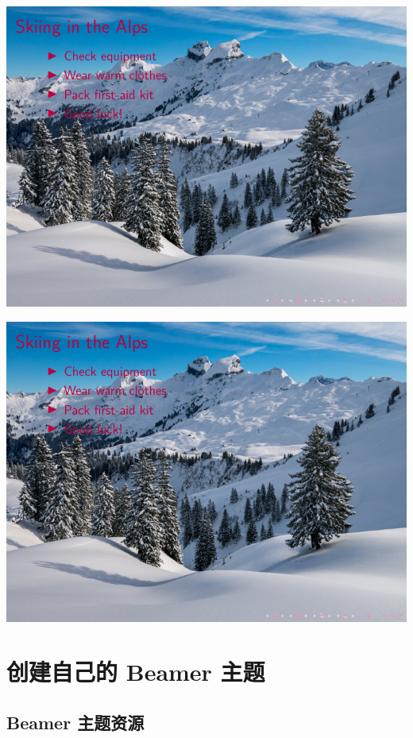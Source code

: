 \begin{column}{0.5\textwidth}
\includegraphics[page=1]{examples/beamer/theme-background-within-single-frame.pdf}

\includegraphics[page=2]{examples/beamer/theme-background-within-single-frame.pdf}

\section{创建自己的 Beamer 主题}

\subsection{Beamer 主题资源}


\end{column}
